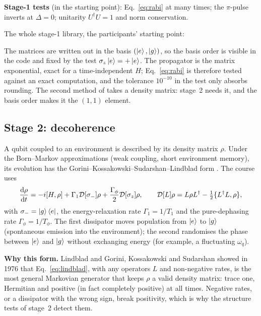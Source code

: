 \textbf{Stage-1 tests} (in the starting point): Eq.~\eqref{eq:rabi} at many times; the
$\pi$-pulse inverts at $\Delta = 0$; unitarity $U^\dagger U = 1$ and norm conservation.

The whole stage-1 library, the participants' starting point:

The matrices are written out in the basis $(\ket{e}, \ket{g})$, so the basis order is
visible in the code and fixed by the test $\sigma_z\ket{e} = +\ket{e}$. The propagator is
the matrix exponential, exact for a time-independent $H$; Eq.~\eqref{eq:rabi} is
therefore tested against an exact computation, and the tolerance $10^{-10}$ in the test
only absorbs rounding. The second method of  takes a density
matrix: stage~2 needs it, and the basis order makes it the $(1,1)$ element.

\subsection{Stage 2: decoherence}\label{sec:lindblad}

A qubit coupled to an environment is described by its density matrix $\rho$. Under the
Born--Markov approximations (weak coupling, short environment memory), its evolution has
the Gorini--Kossakowski--Sudarshan--Lindblad form . The course
uses
\begin{equation}\label{eq:lindblad}
  \frac{\mathrm{d}\rho}{\mathrm{d} t} = -i[H, \rho] + \Gamma_1 \mathcal{D}[\sigma_-]\rho
    + \frac{\Gamma_\phi}{2}\mathcal{D}[\sigma_z]\rho,
  \qquad
  \mathcal{D}[L]\rho = L\rho L^\dagger - \tfrac12\{L^\dagger L, \rho\},
\end{equation}
with $\sigma_- = \ket{g}\bra{e}$, the energy-relaxation rate $\Gamma_1 = 1/T_1$ and the
pure-dephasing rate $\Gamma_\phi = 1/T_\phi$. The first dissipator moves population from
$\ket{e}$ to $\ket{g}$ (spontaneous emission into the environment); the second randomises
the phase between $\ket{e}$ and $\ket{g}$ without exchanging energy (for example, a
fluctuating $\omega_q$).

\textbf{Why this form.} Lindblad  and Gorini, Kossakowski and Sudarshan
 showed in 1976 that Eq.~\eqref{eq:lindblad}, with any operators $L$ and
non-negative rates, is the most general Markovian generator that keeps $\rho$ a valid
density matrix: trace one, Hermitian and positive (in fact completely positive) at all
times. Negative rates, or a dissipator with the wrong sign, break positivity, which is why
the structure tests of stage~2 detect them.

